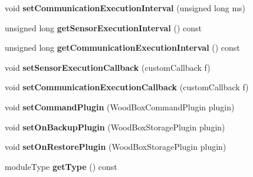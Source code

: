 \begin{DoxyCompactItemize}
void {\bfseries set\+Communication\+Execution\+Interval} (unsigned long ms)
\item 
\mbox{\label{classwood_box_1_1module_1_1_wood_box_module_a4d5b8fd2ec5aeacb5704435bb6d961e7}} 
unsigned long {\bfseries get\+Sensor\+Execution\+Interval} () const
\item 
\mbox{\label{classwood_box_1_1module_1_1_wood_box_module_ad4a7b447a617d9c6908ef624cfd2cab4}} 
unsigned long {\bfseries get\+Communication\+Execution\+Interval} () const
\item 
\mbox{\label{classwood_box_1_1module_1_1_wood_box_module_a5841176b2161324d7e72045e69454c62}} 
void {\bfseries set\+Sensor\+Execution\+Callback} (custom\+Callback f)
\item 
\mbox{\label{classwood_box_1_1module_1_1_wood_box_module_adbdb8028cfb897d3323876be6d117db7}} 
void {\bfseries set\+Communication\+Execution\+Callback} (custom\+Callback f)
\item 
\mbox{\label{classwood_box_1_1module_1_1_wood_box_module_ad40df0835ac2ffcec83cfb96d12f9079}} 
void {\bfseries set\+Command\+Plugin} (Wood\+Box\+Command\+Plugin plugin)
\item 
\mbox{\label{classwood_box_1_1module_1_1_wood_box_module_a94cfcf71ecd1d715d14752001fbc7b6a}} 
void {\bfseries set\+On\+Backup\+Plugin} (Wood\+Box\+Storage\+Plugin plugin)
\item 
\mbox{\label{classwood_box_1_1module_1_1_wood_box_module_a85d4efff4708d41e3097479ab364faac}} 
void {\bfseries set\+On\+Restore\+Plugin} (Wood\+Box\+Storage\+Plugin plugin)
\item 
\mbox{\label{classwood_box_1_1module_1_1_wood_box_module_ab2507312ea013ea5c95b8e1731ddc81d}} 
module\+Type {\bfseries get\+Type} () const
\item 
\mbox{\label{classwood_box_1_1module_1_1_wood_box_module_a2d3f18ce3df3d5fe3b6230fce2199958}} 

\end{DoxyCompactItemize}
